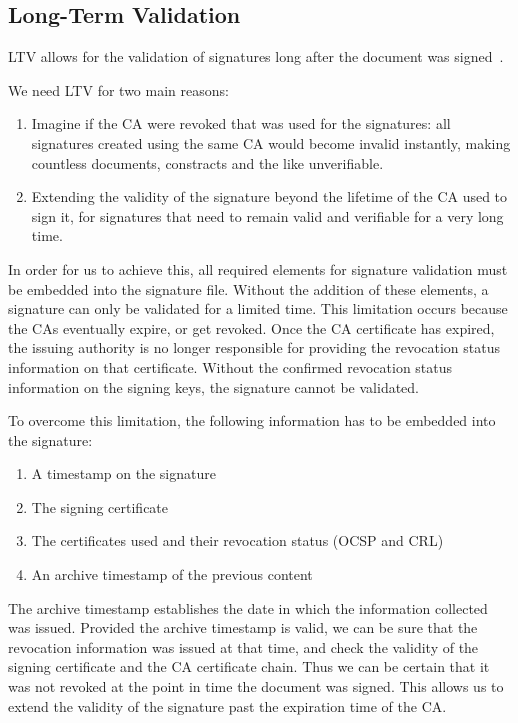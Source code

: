 \subsection{Long-Term Validation}\label{subsec:long-term-validation}
\gls{LTV} allows for the validation of signatures long after the document was signed~\cite{etsipades}.

We need \gls{LTV} for two main reasons:
\begin{enumerate}
    \item Imagine if the \gls{CA} were revoked that was used for the signatures: all signatures created using the same \gls{CA} would become invalid instantly, making countless documents, constracts and the like unverifiable.
    \item Extending the validity of the signature beyond the lifetime of the \gls{CA} used to sign it, for signatures that need to remain valid and verifiable for a very long time.
\end{enumerate}
In order for us to achieve this, all required elements for signature validation must be embedded into the signature file.
Without the addition of these elements, a signature can only be validated for a limited time.
This limitation occurs because the \gls{CA}s eventually expire, or get revoked.
Once the \gls{CA} certificate has expired, the issuing authority is no longer responsible for providing the revocation status information on that certificate.
Without the confirmed revocation status information on the signing keys, the signature cannot be validated.

To overcome this limitation, the following information has to be embedded into the signature:
\begin{enumerate}
    \item A timestamp on the signature
    \item The signing certificate
    \item The certificates used and their revocation status (\gls{OCSP} and \gls{CRL})
    \item An archive timestamp of the previous content
\end{enumerate}

The archive timestamp establishes the date in which the information collected was issued.
Provided the archive timestamp is valid,
we can be sure that the revocation information was issued at that time,
and check the validity of the signing certificate and the \gls{CA} certificate chain.
Thus we can be certain that it was not revoked at the point in time the document was signed.
This allows us to extend the validity of the signature past the expiration time of the \gls{CA}.


